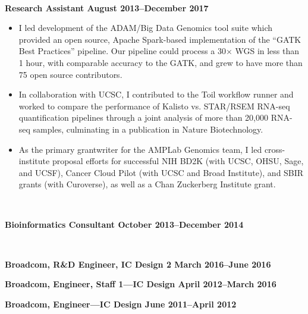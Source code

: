 \documentclass[10pt]{article} %
\begin{document}
\begin {minipage}[t]{0.2\linewidth}
\vspace{0pt}
\end {minipage}
\begin {minipage}[t]{0.8\linewidth}
\vspace{0pt}

 \\
\centerline {{\bf Research Assistant \hfill August 2013--December 2017}}
\begin{itemize}
\item {I led development of the ADAM/Big Data
Genomics tool suite which provided an open source, Apache Spark-based implementation of the ``GATK Best Practices'' pipeline. Our pipeline could process a 30$\times$ WGS in less than 1 hour, with comparable accuracy to the GATK, and grew to have more than 75 open source contributors.}
\item {In collaboration with UCSC, I contributed to the Toil
workflow runner and worked to compare the performance of Kalisto vs. STAR/RSEM RNA-seq quantification pipelines through a joint analysis of more than 20,000 RNA-
seq samples, culminating in a publication in Nature Biotechnology.}
\item {As the primary grantwriter for the AMPLab Genomics team, I led cross-institute
proposal efforts for successful NIH BD2K (with UCSC, OHSU, Sage, and UCSF),
Cancer Cloud Pilot (with UCSC and Broad Institute), and SBIR grants (with
Curoverse), as well as a Chan Zuckerberg Institute grant.}
\end{itemize}

 \\
\centerline {{\bf Bioinformatics Consultant \hfill October 2013--December 2014}}
 \\

\centerline {{\bf Broadcom, R\&D Engineer, IC Design 2 \hfill March 2016--June 2016}}
\centerline {{\bf Broadcom, Engineer, Staff 1---IC Design \hfill April 2012--March 2016}}
\centerline {{\bf Broadcom, Engineer---IC Design \hfill June 2011--April 2012}}
 \\

\end {minipage}
\end{document}
